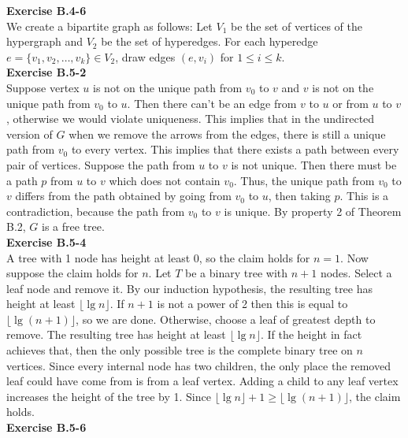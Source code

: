 \documentclass{article}
\begin{document}
\noindent\textbf{Exercise B.4-6}\\

We create a bipartite graph as follows:  Let $V_1$ be the set of vertices of the hypergraph and $V_2$ be the set of hyperedges.  For each hyperedge $e = \{v_1, v_2, \ldots, v_k\} \in V_2$, draw edges $(e,v_i)$ for $1 \leq i \leq k$.  \\

\noindent\textbf{Exercise B.5-2}\\

Suppose vertex $u$ is not on the unique path from $v_0$ to $v$ and $v$ is not on the unique path from $v_0$ to $u$.  Then there can't be an edge from $v$ to $u$ or from $u$ to $v$, otherwise we would violate uniqueness.  This implies that in the undirected version of $G$ when we remove the arrows from the edges, there is still a unique path from $v_0$ to every vertex.  This implies that there exists a path between every pair of vertices.  Suppose the path from $u$ to $v$ is not unique. Then there must be a path $p$ from $u$ to $v$ which does not contain $v_0$.  Thus, the unique path from $v_0$ to $v$ differs from the path obtained by going from $v_0$ to $u$, then taking $p$.  This is a contradiction, because the path from $v_0$ to $v$ is unique.  By property 2 of Theorem B.2, $G$ is a free tree.\\



\noindent\textbf{Exercise B.5-4}\\

A tree with 1 node has height at least 0, so the claim holds for $n=1$.  Now suppose the claim holds for $n$.  Let $T$ be a binary tree with $n+1$ nodes.  Select a leaf node and remove it. By our induction hypothesis, the resulting tree has height at least $\lfloor \lg n \rfloor$. If $n+1$ is not a power of 2 then this is equal to $\lfloor \lg(n+1) \rfloor$, so we are done.  Otherwise, choose a leaf of greatest depth to remove.  The resulting tree has height at least $\lfloor \lg n \rfloor$.  If the height in fact achieves that, then the only possible tree is the complete binary tree on $n$ vertices.  Since every internal node has two children, the only place the removed leaf could have come from is from a leaf vertex.  Adding a child to any leaf vertex increases the height of the tree by 1.  Since $\lfloor \lg n\rfloor + 1 \geq \lfloor \lg(n+1) \rfloor$, the claim holds. \\

\noindent\textbf{Exercise B.5-6}\\
\end{document}
